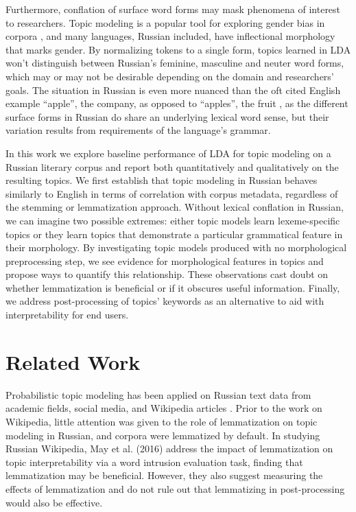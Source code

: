 \documentclass[11pt,a4paper]{article}
\begin{document}
Furthermore, conflation of surface word forms may mask phenomena of interest to researchers. Topic modeling is a popular tool for exploring gender bias in corpora \cite{vogel-jurafsky-2012-said,devinney-etal-2020-semi}, and many languages, Russian included, have inflectional morphology that marks gender. By normalizing tokens to a single form, topics learned in LDA won't distinguish between Russian's feminine, masculine and neuter word forms, which may or may not be desirable depending on the domain and researchers' goals. The situation in Russian is even more nuanced than the oft cited English example ``apple'', the company, as opposed to ``apples'', the fruit \cite{schofield-mimno-2016-comparing}, as the different surface forms in Russian do share an underlying lexical word sense, but their variation results from requirements of the language's grammar.

In this work we explore baseline performance of LDA for topic modeling on a Russian literary corpus and report both quantitatively and qualitatively on the resulting topics. We first establish that topic modeling in Russian behaves similarly to English in terms of correlation with corpus metadata, regardless of the stemming or lemmatization approach. Without lexical conflation in Russian, we can imagine two possible extremes: either topic models learn lexeme-specific topics or they learn topics that demonstrate a particular grammatical feature in their morphology. By investigating topic models produced with no morphological preprocessing step, we see evidence for morphological features in topics and propose ways to quantify this relationship. These observations cast doubt on whether lemmatization is beneficial or if it obscures useful information. Finally, we address post-processing of topics' keywords as an alternative to aid with interpretability for end users.

\section{Related Work}
Probabilistic topic modeling has been applied on Russian text data from academic fields, social media, and Wikipedia articles \cite{mitrofanova2015probabilistic,koltsova2013,May2016AnAO}. Prior to the work on Wikipedia, little attention was given to the role of lemmatization on topic modeling in Russian, and corpora were lemmatized by default. In studying Russian Wikipedia, May et al. (2016) address the impact of lemmatization on topic interpretability via a word intrusion evaluation task, finding that lemmatization may be beneficial. However, they also suggest measuring the effects of lemmatization and do not rule out that lemmatizing in post-processing would also be effective.
\end{document}
